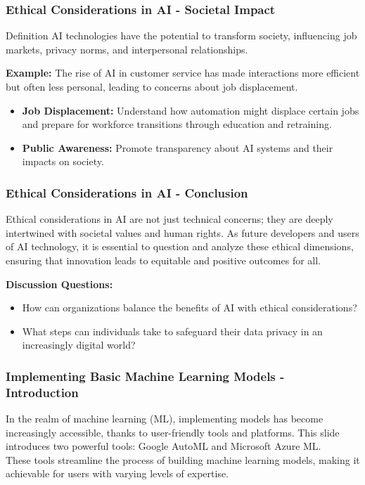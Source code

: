 \documentclass[aspectratio=169]{beamer}
\begin{document}
\begin{frame}[fragile]
    \frametitle{Ethical Considerations in AI - Societal Impact}
    \begin{block}{Definition}
        AI technologies have the potential to transform society, influencing job markets, privacy norms, and interpersonal relationships.
    \end{block}
    
    \textbf{Example:} The rise of AI in customer service has made interactions more efficient but often less personal, leading to concerns about job displacement.
    
    \begin{itemize}
        \item \textbf{Job Displacement:} Understand how automation might displace certain jobs and prepare for workforce transitions through education and retraining.
        \item \textbf{Public Awareness:} Promote transparency about AI systems and their impacts on society.
    \end{itemize}
\end{frame}

\begin{frame}[fragile]
    \frametitle{Ethical Considerations in AI - Conclusion}
    Ethical considerations in AI are not just technical concerns; they are deeply intertwined with societal values and human rights. 
    As future developers and users of AI technology, it is essential to question and analyze these ethical dimensions, ensuring that innovation leads to equitable and positive outcomes for all.
    
    \textbf{Discussion Questions:}
    \begin{itemize}
        \item How can organizations balance the benefits of AI with ethical considerations?
        \item What steps can individuals take to safeguard their data privacy in an increasingly digital world?
    \end{itemize}
\end{frame}

\begin{frame}
    \frametitle{Implementing Basic Machine Learning Models - Introduction}
    In the realm of machine learning (ML), implementing models has become increasingly accessible, thanks to user-friendly tools and platforms. This slide introduces two powerful tools: Google AutoML and Microsoft Azure ML. 
    \\[0.3cm]
    These tools streamline the process of building machine learning models, making it achievable for users with varying levels of expertise.
\end{frame}
\end{document}
